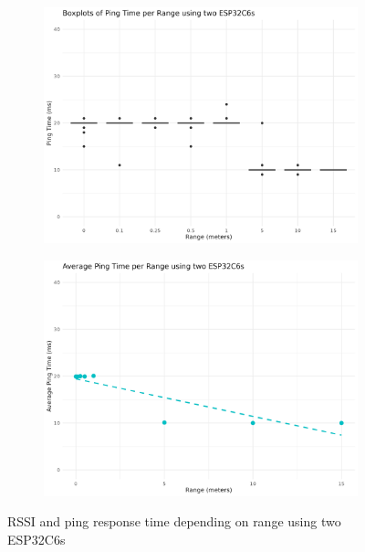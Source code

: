 \begin{figure}[H]
    \begin{subfigure}{0.45\textwidth}
        \includegraphics[width=\linewidth]{rstudio/analysis/plots/ESP32C6_ping_box.png}
    \end{subfigure}
    \begin{subfigure}{0.45\textwidth}
        \includegraphics[width=\linewidth]{rstudio/analysis/plots/ESP32C6_avg_ping.png}
    \end{subfigure}
    \vspace{\ftspace}
    \caption{RSSI and ping response time depending on range using two ESP32C6s}
    \label{fig:rssipingrange_esp32c6}
\end{figure}

